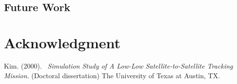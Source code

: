 \documentclass[12pt]{article}
\begin{document}
		\subsection{Future Work}
\section{Acknowledgment}
	
	


\begin{thebibliography}{9}

   Kim. (2000).
  \emph{\ Simulation Study of A Low-Low Satellite-to-Satellite Tracking Mission}. (Doctoral dissertation)
  The University of Texas at Austin, TX.
 

\end{thebibliography}
\end{document}
